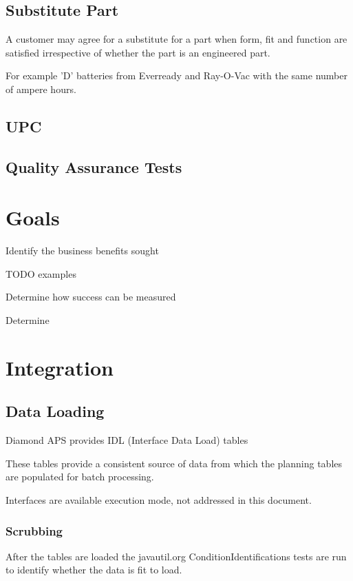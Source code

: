 \documentclass[letterpaper,10pt,english]{sphinxmanual}
\begin{document}
\section{Substitute Part}
\label{APS/Glossary:substitute-part}
A customer may agree for a substitute for a part when form, fit and
function are satisfied irrespective of whether the part is an engineered
part.

For example ’D’ batteries from Everready and Ray-O-Vac with the same
number of ampere hours.


\section{UPC}
\label{APS/Glossary:upc}

\section{Quality Assurance Tests}
\label{APS/Glossary:id1}

\chapter{Goals}
\label{APS/Goals::doc}\label{APS/Goals:goals}
Identify the business benefits sought

TODO examples

Determine how success can be measured

Determine


\chapter{Integration}
\label{APS/Integration::doc}\label{APS/Integration:integration}

\section{Data Loading}
\label{APS/Integration:data-loading}
Diamond APS provides IDL (Interface Data Load) tables

These tables provide a consistent source of data from
which the planning tables are populated for batch processing.

Interfaces are available execution mode, not addressed
in this document.


\subsection{Scrubbing}
\label{APS/Integration:scrubbing}
After the tables are loaded the javautil.org ConditionIdentifications
tests are run to identify whether the data is fit to load.
\end{document}
